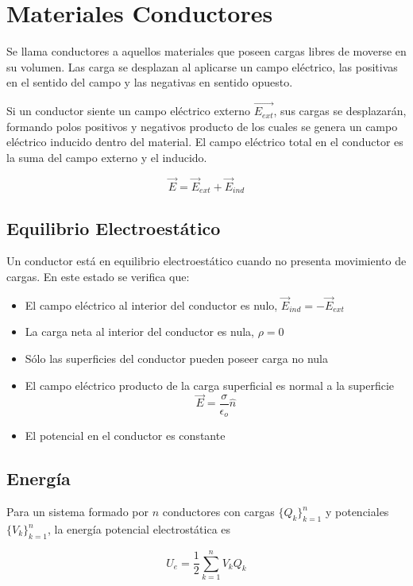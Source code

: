 \section{Materiales Conductores}

Se llama conductores a aquellos materiales que poseen cargas libres de moverse en su volumen. Las carga se desplazan al aplicarse un campo eléctrico, las positivas en el sentido del campo y las negativas en sentido opuesto.

Si un conductor siente un campo eléctrico externo $\Vec{E_{ext}}$, sus cargas se desplazarán, formando polos positivos y negativos producto de los cuales se genera un campo eléctrico inducido dentro del material. El campo eléctrico total en el conductor es la suma del campo externo y el inducido.

\[\Vec{E} = \Vec{E}_{ext}+\Vec{E}_{ind}\]

\subsection{Equilibrio Electroestático}

Un conductor está en equilibrio electroestático cuando no presenta movimiento de cargas. En este estado se verifica que:

\begin{itemize}
    \item El campo eléctrico al interior del conductor es nulo, $\Vec{E}_{ind} = -\Vec{E}_{ext}$
    \item La carga neta al interior del conductor es nula, $\rho = 0$
    \item Sólo las superficies del conductor pueden poseer carga no nula
    \item El campo eléctrico producto de la carga superficial es normal a la superficie
    \[\Vec{E}=\frac{\sigma}{\epsilon_o}\hat{n}\]
    \item El potencial en el conductor es constante 
\end{itemize}

\subsection{Energía}

Para un sistema formado por $n$ conductores con cargas $\{Q_k\}^n_{k=1}$ y potenciales $\{V_k\}^n_{k=1}$, la energía potencial electrostática es

\[U_e = \frac{1}{2}\sum^n_{k=1}V_kQ_k\]

